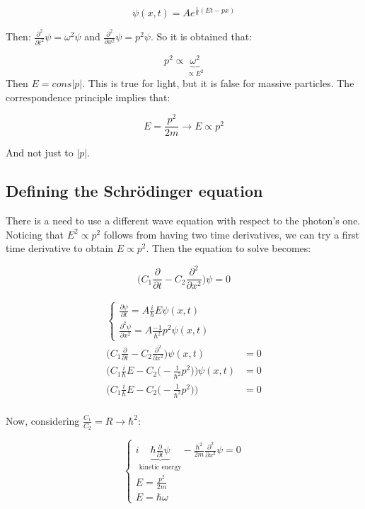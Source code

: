   $$\psi(x,t) = Ae^{\frac{i}{\hbar}(Et -px)}$$

\noindent
  Then: $\frac{\partial^2{}}{\partial{t^2}}\psi = \omega^2\psi$ and $\frac{\partial^2}{\partial x^2}\psi = p^2\psi$.
  So it is obtained that:

  $${p^2}\propto\underbrace{\omega^2}_{\propto E^2}$$
\noindent
  Then $E = cons|p|$.
  This is true for light, but it is false for massive particles. The correspondence principle implies that:

  $$E = \frac{p^2}{2m}\rightarrow E\propto p^2$$

  And not just to $|p|$.

  \subsection{Defining the Schr\"odinger equation}
  There is a need to use a different wave equation with respect to the photon's one.
  Noticing that $E^2\propto p^2$ follows from having two time derivatives, we can try a first time derivative to obtain $E\propto p^2$.
  Then the equation to solve becomes:

  $$\biggl(C_1\frac{\partial}{\partial t}-C_2\frac{\partial^2}{\partial x^2}\biggr)\psi = 0$$

  \begin{align*}
    \begin{cases}\frac{\partial\psi}{\partial t} = A\frac{i}{\hbar}E\psi(x,t)\\\frac{\partial^2\psi}{\partial x^2} = A\frac{-1}{\hbar^2}p^2\psi(x,t)\end{cases}\\
    \biggl(C_1\frac{\partial}{\partial t} - C_2\frac{\partial^2}{\partial x^2}\biggr)\psi(x,t) &=0\\
    \biggl(C_1\frac{i}{\hbar}E-C_2\bigl(-\frac{1}{\hbar^2}p^2\bigr)\biggr)\psi(x,t) &= 0\\
    \biggl(C_1\frac{i}{\hbar}E-C_2\bigl(-\frac{1}{\hbar^2}p^2\bigr)\biggr) &= 0\\
  \end{align*}

  Now, considering $\frac{C_1}{C_2}=R\rightarrow \hbar^2$:

  $$\begin{cases} i\underbrace{\hbar\frac{\partial}{\partial t}\psi}_{\text{kinetic energy}}-\frac{\hbar^2}{2m}\frac{\partial^2}{\partial x^2}\psi = 0\\E =\frac{p^2}{2m}\\E = \hbar\omega\end{cases}$$

